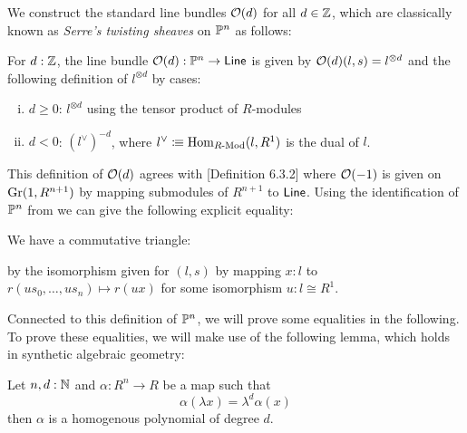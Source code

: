 We construct the standard line bundles $\mathcal{O}(d)$ for all $d\in\mathbb{Z}$,
which are classically known as \emph{Serre's twisting sheaves} on $\mathbb{P}^n$ as follows:

\begin{definition}
  For $d:\mathbb{Z}$, the line bundle $\mathcal{O}(d):\mathbb{P}^n\to \mathsf{Line}$ is given by $\mathcal{O}(d)(l,s) = l^{\otimes d}$
  and the following definition of $l^{\otimes d}$ by cases:
  \begin{enumerate}[(i)]
  \item $d \geqslant 0$: $l^{\otimes d}$ using the tensor product of $R$-modules
  \item $d < 0$: $(l^{\vee})^{-d}$, where $l^{\vee}\vcentcolon\mspace{-1.2mu}\equiv\mathrm{Hom}_{R\text{-}\mathrm{Mod}}(l,R^1)$ is the dual of $l$.
  \end{enumerate}
\end{definition}

This definition of $\mathcal{O}(d)$ agrees with \cite{draft}[Definition 6.3.2] where $\mathcal{O}(-1)$
is given on $\mathrm{Gr}(1,R^{n+1})$ by mapping submodules of $R^{n+1}$ to $\mathsf{Line}$.
Using the identification of $\mathbb{P}^n$ from  we can give the following explicit equality:

\begin{remark}
  We have a commutative triangle:
  \begin{center}
  \end{center}

by the isomorphism given for $(l,s)$ by mapping $x:l$ to $r(u s_0,\dots, u s_n)\mapsto r(u x)$ for some isomorphism $u:l\cong R^1$.
\end{remark}

\medskip

 Connected to this definition of $\mathbb{P}^n$, we will prove some equalities in the following.
 To prove these equalities, we will make use of the following lemma, which holds in synthetic algebraic geometry:
 
\begin{lemma}\label{invariant-implies-homogenous}
  Let $n,d:\mathbb{N}$ and $\alpha:R^n\to R$ be a map such that
  \[\alpha(\lambda x)=\lambda^d\alpha(x)\]
  then $\alpha$ is a homogenous polynomial of degree $d$.
\end{lemma}

